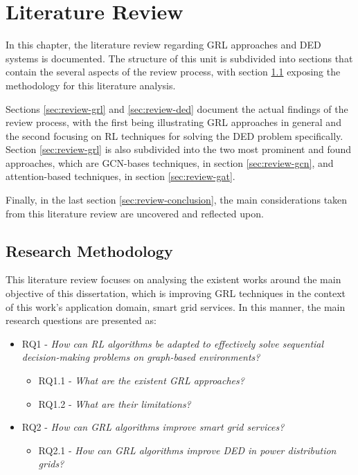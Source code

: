 \chapter{Literature Review} \label{chap:review}

In this chapter, the literature review regarding \ac{GRL} approaches and \ac{DED} systems is documented. The structure of this unit is subdivided into sections that contain the several aspects of the review process, with section \ref{sec:review-method} exposing the methodology for this literature analysis. \par
Sections \ref{sec:review-grl} and \ref{sec:review-ded} document the actual findings of the review process, with the first being illustrating \ac{GRL} approaches in general and the second focusing on \ac{RL} techniques for solving the \acf{DED} problem specifically. Section \ref{sec:review-grl} is also subdivided into the two most prominent and found approaches, which are \ac{GCN}-bases techniques, in section \ref{sec:review-gcn}, and attention-based techniques, in section \ref{sec:review-gat}. \par
Finally, in the last section \ref{sec:review-conclusion}, the main considerations taken from this literature review are uncovered and reflected upon.

\section{Research Methodology} \label{sec:review-method}

This literature review focuses on analysing the existent works around the main objective of this dissertation, which is improving \ac{GRL} techniques in the context of this work's application domain, smart grid services. In this manner, the main research questions are presented as:

\begin{itemize}
	\item RQ1 - \textit{How can \ac{RL} algorithms be adapted to effectively solve sequential decision-making problems on graph-based environments?} 
	\begin{itemize}
		\item RQ1.1 - \textit{What are the existent \ac{GRL} approaches?}
		\item RQ1.2 - \textit{What are their limitations? }
	\end{itemize}
	\item RQ2 - \textit{How can \ac{GRL} algorithms improve smart grid services?}
	\begin{itemize}
		\item RQ2.1 - \textit{How can \ac{GRL} algorithms improve \acf{DED} in power distribution grids?}
	\end{itemize}
\end{itemize}

